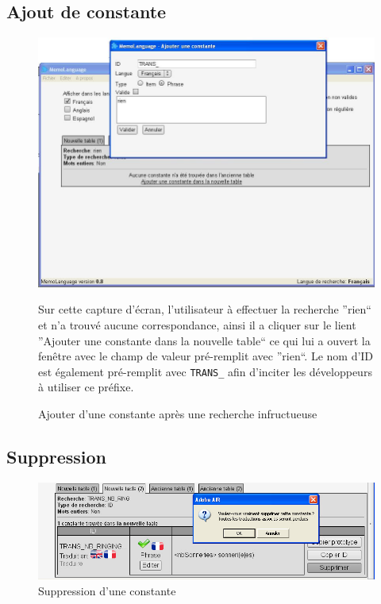     \subsection{Ajout de constante}
    \label{ajoutCst}
        \begin{figure}[H]
            \centering
            \includegraphics[width=16cm]{images/2-activite/ajoutCst.jpg}

            Sur cette capture d'écran, l'utilisateur à effectuer la recherche ''rien`` et n'a trouvé aucune correspondance, ainsi il a cliquer sur le lient ''Ajouter une constante dans la nouvelle table`` ce qui lui a ouvert la fenêtre avec le champ de valeur pré-remplit avec ''rien``.
            Le nom d'ID est également pré-remplit avec \texttt{TRANS\_} afin d'inciter les développeurs à utiliser ce préfixe.
            \caption{Ajouter d'une constante après une recherche infructueuse}
        \end{figure}
    \subsection{Suppression}
    \label{suppression}
        \begin{figure}[H]
        \centering
        \includegraphics[width=16cm]{images/2-activite/suppression.jpg}
        \caption{Suppression d'une constante}
    \end{figure}
